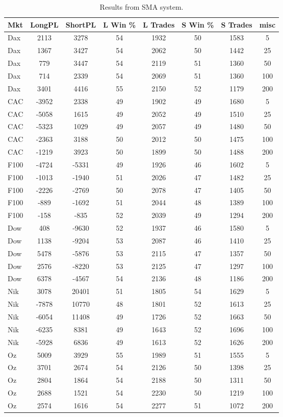 \begin{table}[ht]
\centering
\caption[SMA Base System]{Results from SMA system.} 
\label{tab:sma_results}
\begin{tabular}{lccccccc}
  \toprule Mkt & LongPL & ShortPL & L Win \% & L Trades & S Win \% & S Trades & misc \\ 
  \midrule Dax & 2113 & 3278 & 54 & 1932 & 50 & 1583 & 5 \\ 
  Dax & 1367 & 3427 & 54 & 2062 & 50 & 1442 & 25 \\ 
  Dax & 779 & 3447 & 54 & 2119 & 51 & 1360 & 50 \\ 
  Dax & 714 & 2339 & 54 & 2069 & 51 & 1360 & 100 \\ 
  Dax & 3401 & 4416 & 55 & 2150 & 52 & 1179 & 200 \\ 
  CAC & -3952 & 2338 & 49 & 1902 & 49 & 1680 & 5 \\ 
  CAC & -5058 & 1615 & 49 & 2052 & 49 & 1510 & 25 \\ 
  CAC & -5323 & 1029 & 49 & 2057 & 49 & 1480 & 50 \\ 
  CAC & -2363 & 3188 & 50 & 2012 & 50 & 1475 & 100 \\ 
  CAC & -1219 & 3923 & 50 & 1899 & 50 & 1488 & 200 \\ 
  F100 & -4724 & -5331 & 49 & 1926 & 46 & 1602 & 5 \\ 
  F100 & -1013 & -1940 & 51 & 2026 & 47 & 1482 & 25 \\ 
  F100 & -2226 & -2769 & 50 & 2078 & 47 & 1405 & 50 \\ 
  F100 & -889 & -1692 & 51 & 2044 & 48 & 1389 & 100 \\ 
  F100 & -158 & -835 & 52 & 2039 & 49 & 1294 & 200 \\ 
  Dow & 408 & -9630 & 52 & 1937 & 46 & 1580 & 5 \\ 
  Dow & 1138 & -9204 & 53 & 2087 & 46 & 1410 & 25 \\ 
  Dow & 5478 & -5876 & 53 & 2115 & 47 & 1357 & 50 \\ 
  Dow & 2576 & -8220 & 53 & 2125 & 47 & 1297 & 100 \\ 
  Dow & 6378 & -4567 & 54 & 2136 & 48 & 1186 & 200 \\ 
  Nik & 3078 & 20401 & 51 & 1805 & 54 & 1629 & 5 \\ 
  Nik & -7878 & 10770 & 48 & 1801 & 52 & 1613 & 25 \\ 
  Nik & -6054 & 11408 & 49 & 1726 & 52 & 1663 & 50 \\ 
  Nik & -6235 & 8381 & 49 & 1643 & 52 & 1696 & 100 \\ 
  Nik & -5928 & 6836 & 49 & 1613 & 52 & 1626 & 200 \\ 
  Oz & 5009 & 3929 & 55 & 1989 & 51 & 1555 & 5 \\ 
  Oz & 3701 & 2674 & 54 & 2126 & 50 & 1398 & 25 \\ 
  Oz & 2804 & 1864 & 54 & 2188 & 50 & 1311 & 50 \\ 
  Oz & 2688 & 1521 & 54 & 2230 & 50 & 1219 & 100 \\ 
  Oz & 2574 & 1616 & 54 & 2277 & 51 & 1072 & 200 \\ 
   \bottomrule \end{tabular}
\end{table}
